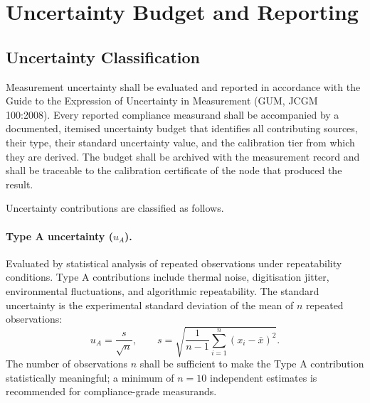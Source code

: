 \documentclass[11pt]{article}
\begin{document}
\section{Uncertainty Budget and Reporting}

\subsection*{Uncertainty Classification}

Measurement uncertainty shall be evaluated and reported in accordance with the Guide to the Expression of Uncertainty in Measurement (GUM, JCGM 100:2008). Every reported compliance measurand shall be accompanied by a documented, itemised uncertainty budget that identifies all contributing sources, their type, their standard uncertainty value, and the calibration tier from which they are derived. The budget shall be archived with the measurement record and shall be traceable to the calibration certificate of the node that produced the result.

Uncertainty contributions are classified as follows.

\paragraph{Type A uncertainty ($u_A$).} Evaluated by statistical analysis of repeated observations under repeatability conditions. Type A contributions include thermal noise, digitisation jitter, environmental fluctuations, and algorithmic repeatability. The standard uncertainty is the experimental standard deviation of the mean of $n$ repeated observations:
\begin{equation}
u_A = \frac{s}{\sqrt{n}}, \qquad s = \sqrt{\frac{1}{n-1} \sum_{i=1}^{n} (x_i - \bar{x})^2}.
\label{eq:typeA}
\end{equation}
The number of observations $n$ shall be sufficient to make the Type A contribution statistically meaningful; a minimum of $n = 10$ independent estimates is recommended for compliance-grade measurands.
\end{document}
